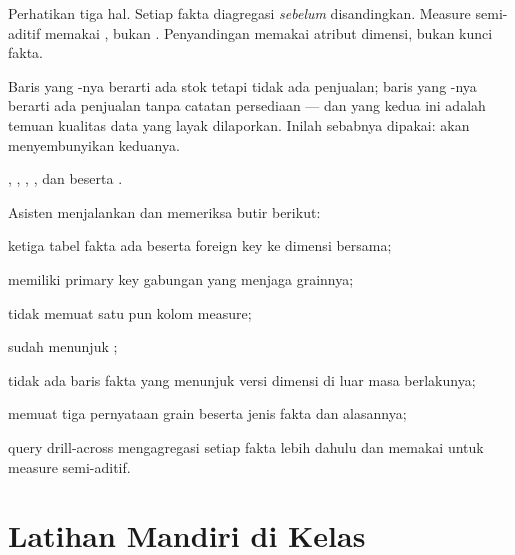 Perhatikan tiga hal. Setiap fakta diagregasi \emph{sebelum} disandingkan.
Measure semi-aditif memakai , bukan . Penyandingan
memakai atribut dimensi, bukan kunci fakta.

\begin{catatan}
Baris yang -nya  berarti ada stok tetapi
tidak ada penjualan; baris yang -nya 
berarti ada penjualan tanpa catatan persediaan --- dan yang kedua ini adalah
temuan kualitas data yang layak dilaporkan. Inilah sebabnya
 dipakai:  akan menyembunyikan
keduanya.
\end{catatan}

\begin{luaran}
, ,
, , dan
 beserta .
\end{luaran}

\begin{checkpoint}
Asisten menjalankan  dan memeriksa butir berikut:
\begin{ceklis}
  \item ketiga tabel fakta ada beserta foreign key ke dimensi bersama;
  \item {} memiliki primary key gabungan yang
        menjaga grainnya;
  \item {} tidak memuat satu pun kolom measure;
  \item {} sudah menunjuk ;
  \item tidak ada baris fakta yang menunjuk versi dimensi di luar masa
        berlakunya;
  \item {} memuat tiga pernyataan grain beserta jenis fakta dan
        alasannya;
  \item query drill-across mengagregasi setiap fakta lebih dahulu dan memakai
         untuk measure semi-aditif.
\end{ceklis}
\end{checkpoint}

\section{Latihan Mandiri di Kelas}

